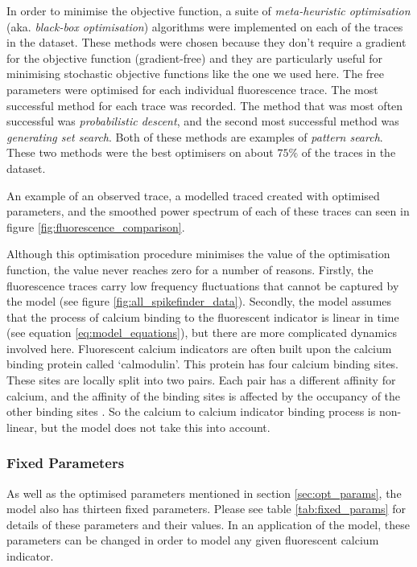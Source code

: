 \documentclass[a4paper,12pt]{article}
\theoremstyle{definition}
\begin{document}
In order to minimise the objective function, a suite of \textit{meta-heuristic optimisation} (aka. \textit{black-box optimisation}) algorithms were implemented on each of the traces in the dataset. These methods were chosen because they don't require a gradient for the objective function (gradient-free) and they are particularly useful for minimising stochastic objective functions like the one we used here. The free parameters were optimised for each individual fluorescence trace. The most successful method for each trace was recorded. The method that was most often successful was \textit{probabilistic descent}, and the second most successful method was \textit{generating set search}. Both of these methods are examples of \textit{pattern search}. These two methods were the best optimisers on about $75\%$ of the traces in the dataset.

An example of an observed trace, a modelled traced created with optimised parameters, and the smoothed power spectrum of each of these traces can seen in figure \ref{fig:fluorescence_comparison}.

Although this optimisation procedure minimises the value of the optimisation function, the value never reaches zero for a number of reasons. Firstly, the fluorescence traces carry low frequency fluctuations that cannot be captured by the model (see figure \ref{fig:all_spikefinder_data}). Secondly, the model assumes that the process of calcium binding to the fluorescent indicator is linear in time (see equation \ref{eq:model_equations}), but there are more complicated dynamics involved here. Fluorescent calcium indicators are often built upon the calcium binding protein called `calmodulin'. This protein has four calcium binding sites. These sites are locally split into two pairs. Each pair has a different affinity for calcium, and the affinity of the binding sites is affected by the occupancy of the other binding sites \cite{kilhoffer}. So the calcium to calcium indicator binding process is non-linear, but the model does not take this into account.

\subsubsection{Fixed Parameters}
As well as the optimised parameters mentioned in section \ref{sec:opt_params}, the model also has thirteen fixed parameters. Please see table \ref{tab:fixed_params} for details of these parameters and their values. In an application of the model, these parameters can be changed in order to model any given fluorescent calcium indicator.
\end{document}

